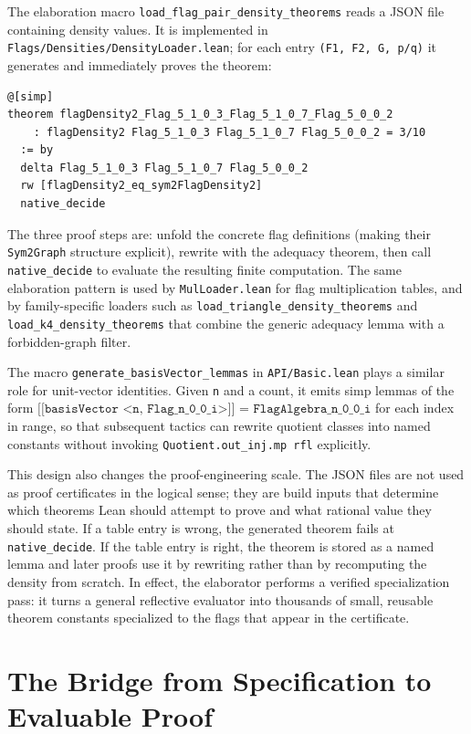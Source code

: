 \documentclass{article}
\newcommand{\lean}[1]{\texttt{#1}}
\begin{document}
The elaboration macro \lean{load\_flag\_pair\_density\_theorems} reads a JSON
file containing density values.  It is implemented in
\lean{Flags/Densities/DensityLoader.lean}; for each entry
\lean{(F1, F2, G, p/q)} it generates and immediately proves the theorem:
\begin{lstlisting}
@[simp]
theorem flagDensity2_Flag_5_1_0_3_Flag_5_1_0_7_Flag_5_0_0_2
    : flagDensity2 Flag_5_1_0_3 Flag_5_1_0_7 Flag_5_0_0_2 = 3/10
  := by
  delta Flag_5_1_0_3 Flag_5_1_0_7 Flag_5_0_0_2
  rw [flagDensity2_eq_sym2FlagDensity2]
  native_decide
\end{lstlisting}
The three proof steps are: unfold the concrete flag definitions (making their
\lean{Sym2Graph} structure explicit), rewrite with the adequacy theorem, then
call \lean{native\_decide} to evaluate the resulting finite computation.  The
same elaboration pattern is used by \lean{MulLoader.lean} for flag
multiplication tables, and by family-specific loaders such as
\lean{load\_triangle\_density\_theorems} and
\lean{load\_k4\_density\_theorems} that combine the generic adequacy lemma
with a forbidden-graph filter.

The macro \lean{generate\_basisVector\_lemmas} in \lean{API/Basic.lean} plays
a similar role for unit-vector identities.  Given \lean{n} and a count, it
emits simp lemmas of the form
$\lean{[[basisVector <n, Flag\_n\_0\_0\_i>]] = FlagAlgebra\_n\_0\_0\_i}$ for
each index in range, so that subsequent tactics can rewrite quotient classes
into named constants without invoking \lean{Quotient.out\_inj.mp rfl}
explicitly.

This design also changes the proof-engineering scale.  The JSON files are not
used as proof certificates in the logical sense; they are build inputs that
determine which theorems Lean should attempt to prove and what rational value
they should state.  If a table entry is wrong, the generated theorem fails at
\lean{native\_decide}.  If the table entry is right, the theorem is stored as
a named lemma and later proofs use it by rewriting rather than by recomputing
the density from scratch.  In effect, the elaborator performs a verified
specialization pass: it turns a general reflective evaluator into thousands
of small, reusable theorem constants specialized to the flags that appear in
the certificate.

\section{The Bridge from Specification to Evaluable Proof}
\label{sec:bridge}
\end{document}

